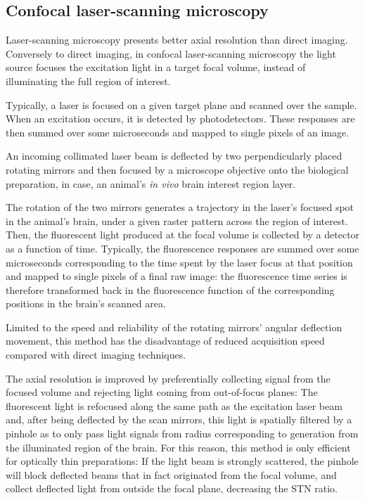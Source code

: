 \subsection{Confocal laser-scanning microscopy}

Laser-scanning microscopy presents better axial resolution than direct imaging. Conversely to direct imaging, in confocal laser-scanning microscopy the light source focuses the excitation light in a target focal volume, instead of illuminating the full region of interest. 

Typically, a laser is focused on a given target plane and scanned over the sample. When an excitation occurs, it is detected by photodetectors. These responses are then summed over some microseconds and mapped to single pixels of an image.

An incoming collimated laser beam is deflected by two perpendicularly placed rotating mirrors and then focused by a microscope objective onto the biological preparation, in case, an animal's \textit{in vivo} brain interest region layer.

The rotation of the two mirrors generates a trajectory in the laser's focused spot in the animal's brain, under a given raster pattern across the region of interest. Then, the fluorescent light produced at the focal volume is collected by a detector as a function of time. Typically, the fluorescence responses are summed over some microseconds corresponding to the time spent by the laser focus at that position and mapped to single pixels of a final raw image: the fluorescence time series is therefore transformed back in the fluorescence function of the corresponding positions in the brain's scanned area. 

Limited to the speed and reliability of the rotating mirrors' angular deflection movement, this method has the disadvantage of reduced acquisition speed compared with direct imaging techniques. 

The axial resolution is improved by preferentially collecting signal from the focused volume and rejecting light coming from out-of-focus planes: The fluorescent light is refocused along the same path as the excitation laser beam and, after being deflected by the scan mirrors, this light is spatially filtered by a pinhole as to only pass light signals from radius corresponding to generation from the illuminated region of the brain. For this reason, this method is only efficient for optically thin preparations: If the light beam is strongly scattered, the pinhole will block deflected beams that in fact originated from the focal volume, and collect deflected light from outside the focal plane, decreasing the STN ratio. 



